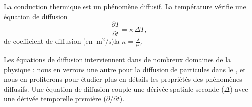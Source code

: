 \documentclass[12pt,fancy]{cours}
\begin{document}
\begin{theorem}\label{form:diffu}
  La conduction thermique est un phénomène diffusif. La température vérifie une équation de diffusion
\begin{equation*}
\frac{\partial T}{\partial t}=\kappa\,\Delta{T},
\end{equation*}
de coefficient de diffusion (en $\SI{}{\meter\squared\per\second}$)la  $\kappa = \frac{\lambda}{\rho c}$.
\end{theorem}
\noindent Les équations de diffusion interviennent dans de nombreux domaines de la physique : nous en verrons une autre pour la diffusion de particules dans le , et nous en profiterons pour étudier plus en détails les propriétés des phénomènes diffusifs. Une équation de diffusion couple une dérivée spatiale seconde ($\Delta$) avec une dérivée temporelle première ($\partial/\partial t$).


\end{document}
